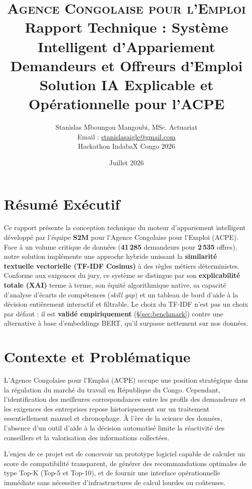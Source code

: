 \documentclass[11pt,a4paper]{article}
\title{%
  \vspace{-1.2cm}
  {\normalsize \textsc{Agence Congolaise pour l'Emploi}}\\[0.6em]
  \textbf{Rapport Technique : Système Intelligent d'Appariement\\
  Demandeurs et Offreurs d'Emploi}\\[0.3em]
  {\large Solution IA Explicable et Opérationnelle pour l'ACPE}}
\author{Stanislas Mboungou Mangoubi, MSc. Actuariat\\
  \small Email : \href{mailto:stanislasaigle@gmail.com}{stanislasaigle@gmail.com}\\
  \small Hackathon IndabaX Congo 2026}
\date{Juillet 2026}
\begin{document}
\maketitle
\thispagestyle{fancy}

\section*{Résumé Exécutif}
Ce rapport présente la conception technique du moteur d'appariement intelligent développé
par l'équipe \textbf{S2M} pour l'Agence Congolaise pour l'Emploi (ACPE). Face à un volume
critique de données (\textbf{41\,285} demandeurs pour \textbf{2\,535} offres), notre solution
implémente une approche hybride unissant la \textbf{similarité textuelle vectorielle (TF-IDF
Cosinus)} à des règles métiers déterministes. Conforme aux exigences du jury, ce système se
distingue par son \textbf{explicabilité totale (XAI)} terme à terme, son équité algorithmique
native, sa capacité d'analyse d'écarts de compétences (\emph{skill gap}) et un tableau de bord
d'aide à la décision entièrement interactif et filtrable. Le choix du TF-IDF n'est pas un choix
par défaut : il est \textbf{validé empiriquement} (\S\ref{sec:benchmark}) contre une alternative
à base d'embeddings BERT, qu'il surpasse nettement sur nos données.

\section{Contexte et Problématique}
L'Agence Congolaise pour l'Emploi (ACPE) occupe une position stratégique dans la régulation
du marché du travail en République du Congo. Cependant, l'identification des meilleures
correspondances entre les profils des demandeurs et les exigences des entreprises repose
historiquement sur un traitement essentiellement manuel et chronophage. À l'ère de la science
des données, l'absence d'un outil d'aide à la décision automatisé limite la réactivité des
conseillers et la valorisation des informations collectées.

L'enjeu de ce projet est de concevoir un prototype logiciel capable de calculer un score de
compatibilité transparent, de générer des recommandations optimales de type Top-K (Top-5 et
Top-10), et de fournir une interface opérationnelle immédiate sans nécessiter d'infrastructures
de calcul lourdes ou coûteuses.
\end{document}
